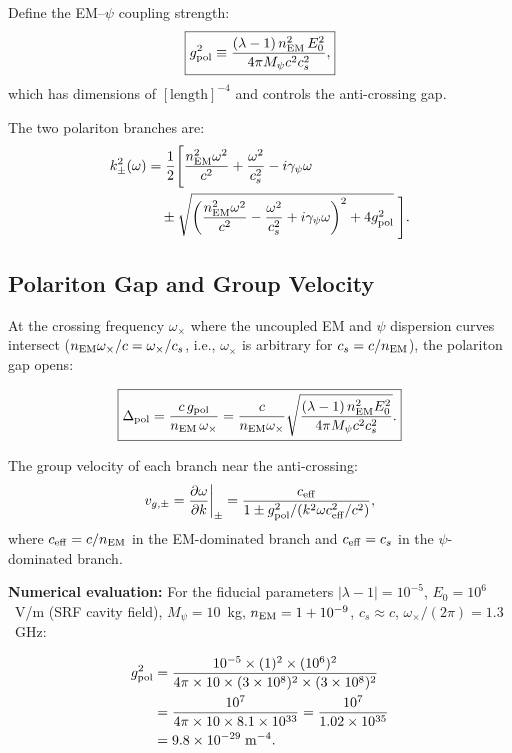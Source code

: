 \documentclass[aps,prd,twocolumn,superscriptaddress,nofootinbib]{revtex4-2}
\begin{document}
Define the EM--$\psi$ coupling strength:
\begin{equation}
\boxed{
g_{\rm pol}^2 \equiv \frac{(\lambda-1)\,n_{\rm EM}^2\,E_0^2}
{4\pi M_\psi c^2 c_s^2},
}
\label{eq:coupling_strength}
\end{equation}
which has dimensions of $[\text{length}]^{-4}$ and controls the
anti-crossing gap.

The two polariton branches are:
\begin{align}
k^2_\pm(\omega) &= \frac{1}{2}\Bigg[
\frac{n_{\rm EM}^2\omega^2}{c^2}
+ \frac{\omega^2}{c_s^2} - i\gamma_\psi\omega
\nonumber\\
&\quad \pm\sqrt{\left(\frac{n_{\rm EM}^2\omega^2}{c^2}
- \frac{\omega^2}{c_s^2} + i\gamma_\psi\omega\right)^2
+ 4g_{\rm pol}^2}
\;\Bigg].
\label{eq:polariton_branches}
\end{align}

\subsection{Polariton Gap and Group Velocity}

At the crossing frequency $\omega_\times$ where the uncoupled EM and
$\psi$ dispersion curves intersect ($n_{\rm EM}\omega_\times/c = \omega_\times/c_s$,
i.e., $\omega_\times$ is arbitrary for $c_s = c/n_{\rm EM}$), the
polariton gap opens:

\begin{equation}
\boxed{
\Delta_{\rm pol} = \frac{c\,g_{\rm pol}}{n_{\rm EM}\,\omega_\times}
= \frac{c}{n_{\rm EM}\omega_\times}\sqrt{
\frac{(\lambda-1)\,n_{\rm EM}^2 E_0^2}{4\pi M_\psi c^2 c_s^2}}.
}
\label{eq:polariton_gap}
\end{equation}

The group velocity of each branch near the anti-crossing:
\begin{equation}
v_{g,\pm} = \frac{\partial\omega}{\partial k}\bigg|_\pm
= \frac{c_{\rm eff}}{1 \pm g_{\rm pol}^2/(k^2\omega c_{\rm eff}^2/c^2)},
\label{eq:group_velocity}
\end{equation}
where $c_{\rm eff} = c/n_{\rm EM}$ in the EM-dominated branch and
$c_{\rm eff} = c_s$ in the $\psi$-dominated branch.

\textbf{Numerical evaluation:} For the fiducial parameters
$|\lambda-1| = 10^{-5}$, $E_0 = 10^6$~V/m (SRF cavity field),
$M_\psi = 10$~kg, $n_{\rm EM} = 1 + 10^{-9}$, $c_s \approx c$,
$\omega_\times/(2\pi) = 1.3$~GHz:

\begin{align}
g_{\rm pol}^2 &= \frac{10^{-5}\times(1)^2\times(10^6)^2}
{4\pi\times10\times(3\times10^8)^2\times(3\times10^8)^2}
\nonumber\\
&= \frac{10^7}{4\pi\times10\times8.1\times10^{33}}
= \frac{10^7}{1.02\times10^{35}} \nonumber\\
&= 9.8\times10^{-29}\;\si{m^{-4}}.
\end{align}
\end{document}
